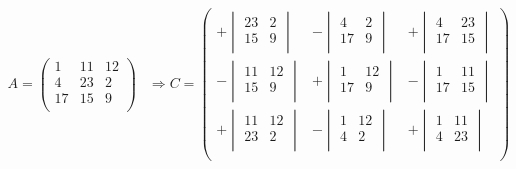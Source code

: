 \documentclass{article}
\begin{document}
\begin{equation*}
\begin{split}
A = 
\begin{pmatrix}
1 & 11 & 12 \\
4 & 23 & 2 \\
17 & 15 & 9 \\
\end{pmatrix} & \Rightarrow 
C = 
\begin{pmatrix}
+ \begin{vmatrix}
23 & 2 \\
15 & 9 \\
\end{vmatrix}&
- \begin{vmatrix}
4 & 2 \\
17 & 9 \\
\end{vmatrix}&
+ \begin{vmatrix}
4 & 23 \\
17 & 15 \\
\end{vmatrix} \\
- \begin{vmatrix}
11 & 12 \\
15 & 9 \\
\end{vmatrix}&
+ \begin{vmatrix}
1 & 12 \\
17 & 9 \\
\end{vmatrix}&
- \begin{vmatrix}
1 & 11 \\
17 & 15 \\
\end{vmatrix} \\
+ \begin{vmatrix}
11 & 12 \\
23 & 2\\
\end{vmatrix}&
- \begin{vmatrix}
1 & 12 \\
4 & 2 \\
\end{vmatrix}&
+ \begin{vmatrix}
1 & 11 \\
4 & 23 \\
\end{vmatrix}\\
\end{pmatrix} \\

\end{split}
\end{equation*}
\end{document}
